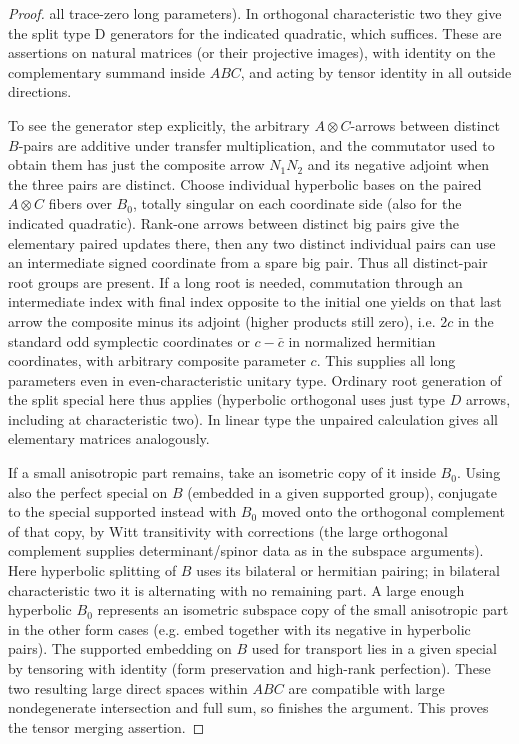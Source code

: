 \begin{proof}
all trace-zero long parameters). In orthogonal characteristic two they give the split type D generators for the indicated quadratic, which suffices. These are assertions on natural matrices (or their projective images), with identity on the complementary summand inside \(ABC\), and acting by tensor identity in all outside directions.

To see the generator step explicitly, the arbitrary \(A\otimes C\)-arrows between distinct \(B\)-pairs are additive under transfer multiplication, and the commutator used to obtain them has just the composite arrow \(N_1N_2\) and its negative adjoint when the three pairs are distinct. Choose individual hyperbolic bases on the paired \(A\otimes C\) fibers over \(B_0\), totally singular on each coordinate side (also for the indicated quadratic). Rank-one arrows between distinct big pairs give the elementary paired updates there, then any two distinct individual pairs can use an intermediate signed coordinate from a spare big pair. Thus all distinct-pair root groups are present. If a long root is needed, commutation through an intermediate index with final index opposite to the initial one yields on that last arrow the composite minus its adjoint (higher products still zero), i.e. \(2c\) in the standard odd symplectic coordinates or \(c-\bar c\) in normalized hermitian coordinates, with arbitrary composite parameter \(c\). This supplies all long parameters even in even-characteristic unitary type. Ordinary root generation of the split special here thus applies (hyperbolic orthogonal uses just type \(D\) arrows, including at characteristic two). In linear type the unpaired calculation gives all elementary matrices analogously.

If a small anisotropic part remains, take an isometric copy of it inside \(B_0\). Using also the perfect special on \(B\) (embedded in a given supported group), conjugate to the special supported instead with \(B_0\) moved onto the orthogonal complement of that copy, by Witt transitivity with corrections (the large orthogonal complement supplies determinant/spinor data as in the subspace arguments). Here hyperbolic splitting of \(B\) uses its bilateral or hermitian pairing; in bilateral characteristic two it is alternating with no remaining part. A large enough hyperbolic \(B_0\) represents an isometric subspace copy of the small anisotropic part in the other form cases (e.g. embed together with its negative in hyperbolic pairs). The supported embedding on \(B\) used for transport lies in a given special by tensoring with identity (form preservation and high-rank perfection). These two resulting large direct spaces within \(ABC\) are compatible with large nondegenerate intersection and full sum, so  finishes the argument. This proves the tensor merging assertion.


\end{proof}
